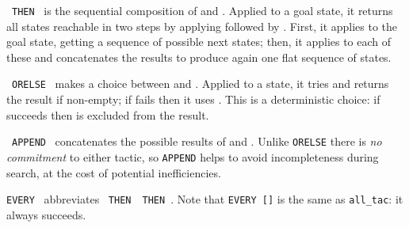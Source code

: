 \begin{isabellebody}
\begin{isamarkuptext}
  \begin{description}

  \item {}~\verb|THEN|~ is the sequential
  composition of  and .  Applied to a goal
  state, it returns all states reachable in two steps by applying
   followed by .  First, it applies  to the goal state, getting a sequence of possible next
  states; then, it applies  to each of these and
  concatenates the results to produce again one flat sequence of
  states.

  \item {}~\verb|ORELSE|~ makes a choice
  between  and .  Applied to a state, it
  tries  and returns the result if non-empty; if  fails then it uses .  This is a deterministic
  choice: if  succeeds then  is excluded
  from the result.

  \item {}~\verb|APPEND|~ concatenates the
  possible results of  and .  Unlike
  \verb|ORELSE| there is \emph{no commitment} to either tactic, so
  \verb|APPEND| helps to avoid incompleteness during search, at
  the cost of potential inefficiencies.

  \item \verb|EVERY|~ abbreviates ~\verb|THEN|~~\verb|THEN|~.
  Note that \verb|EVERY []| is the same as \verb|all_tac|: it always
  succeeds.


\end{description}
\end{isamarkuptext}
\end{isabellebody}
